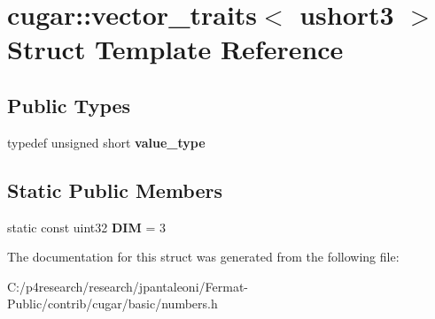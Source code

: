 \hypertarget{structcugar_1_1vector__traits_3_01ushort3_01_4}{}\section{cugar\+:\+:vector\+\_\+traits$<$ ushort3 $>$ Struct Template Reference}
\label{structcugar_1_1vector__traits_3_01ushort3_01_4}
\subsection*{Public Types}
\begin{DoxyCompactItemize}
\item 
\mbox{\label{structcugar_1_1vector__traits_3_01ushort3_01_4_a7badcbf252509d19031427feedec06e1}} 
typedef unsigned short {\bfseries value\+\_\+type}
\end{DoxyCompactItemize}
\subsection*{Static Public Members}
\begin{DoxyCompactItemize}
\item 
\mbox{\label{structcugar_1_1vector__traits_3_01ushort3_01_4_a4a11f67584913e468a52989da12aaa62}} 
static const uint32 {\bfseries D\+IM} = 3
\end{DoxyCompactItemize}


The documentation for this struct was generated from the following file\+:\begin{DoxyCompactItemize}
\item 
C\+:/p4research/research/jpantaleoni/\+Fermat-\/\+Public/contrib/cugar/basic/numbers.\+h\end{DoxyCompactItemize}
